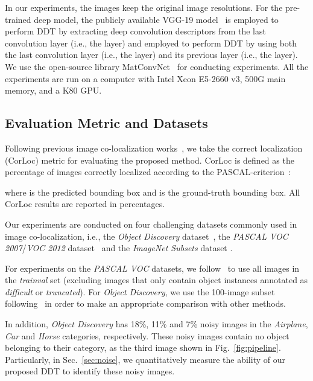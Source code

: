 \documentclass[twocolumn]{svjour3}          \smartqed  \usepackage{graphicx}
\begin{document}
In our experiments, the images keep the original image resolutions. For the pre-trained deep model, the publicly available VGG-19 model~\citep{vgg16} is employed  to perform DDT by extracting deep convolution descriptors from the last convolution layer (i.e., the  layer) and employed to perform DDT by using both the last convolution layer (i.e., the  layer) and its previous layer (i.e., the  layer). We use the open-source library MatConvNet~\citep{matconvnet} for conducting experiments. All the experiments are run on a computer with Intel Xeon E5-2660 v3, 500G main memory, and a K80 GPU.

\subsection{Evaluation Metric and Datasets}

Following previous image co-localization works~\citep{yaoeccv2016,chicvpr2015,tangcvpr2014}, we take the correct localization (CorLoc) metric for evaluating the proposed method. CorLoc is defined as the percentage of images correctly localized according to the PASCAL-criterion~\citep{voc2015}:

where  is the predicted bounding box and  is the ground-truth bounding box. All CorLoc results are reported in percentages.

Our experiments are conducted on four challenging datasets commonly used in image co-localization, i.e., the \emph{Object Discovery} dataset~\citep{rubinscvpr2013}, the \emph{PASCAL VOC 2007}/\emph{VOC 2012} dataset~\citep{voc2015} and the \emph{ImageNet Subsets} dataset \citep{yaoeccv2016}.

For experiments on the \emph{PASCAL VOC} datasets, we follow~\citet{chicvpr2015,yaoeccv2016,joulineccv2014} to use all images in the \emph{trainval} set (excluding images that only contain object instances annotated as \emph{difficult} or \emph{truncated}). For \emph{Object Discovery}, we use the 100-image subset following~\citet{rubinscvpr2013,chicvpr2015} in order to make an appropriate comparison with other methods.

In addition, \emph{Object Discovery} has 18\%, 11\% and 7\% noisy images in the \emph{Airplane}, \emph{Car} and \emph{Horse} categories, respectively. These noisy images contain no object belonging to their category, as the third image shown in Fig.~\ref{fig:pipeline}. Particularly, in Sec.~\ref{sec:noise}, we quantitatively measure the ability of our proposed DDT to identify these noisy images.
\end{document}
